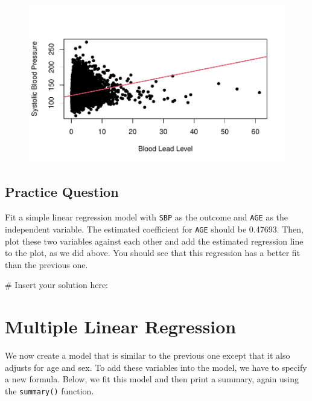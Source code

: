 \documentclass[
  letterpaper,
]{krantz}
\makeatletter
\newenvironment{Shaded}{\begin{snugshade}}{\end{snugshade}}
\newcommand{\CommentTok}[1]{\textcolor[rgb]{0.37,0.37,0.37}{#1}}
\newenvironment{kframe}{%
\medskip{}
\setlength{\fboxsep}{.8em}
 \def\at@end@of@kframe{}%
 \ifinner\ifhmode%
  \def\at@end@of@kframe{\end{minipage}}%
  \begin{minipage}{\columnwidth}%
 \fi\fi%
 \def\FrameCommand##1{\hskip\@totalleftmargin \hskip-\fboxsep
 \colorbox{shadecolor}{##1}\hskip-\fboxsep
     \hskip-\linewidth \hskip-\@totalleftmargin \hskip\columnwidth}%
 \MakeFramed {\advance\hsize-\width
   \@totalleftmargin\z@ \linewidth\hsize
   \@setminipage}}%
 {\par\unskip\endMakeFramed%
 \at@end@of@kframe}
\renewenvironment{Shaded}{\begin{kframe}}{\end{kframe}}
\makeatother
\begin{document}
\begin{figure}[H]

{\centering \includegraphics[width=1\textwidth,height=\textheight]{book/10_linear_regression_files/figure-pdf/unnamed-chunk-6-1.pdf}

}

\end{figure}

\hypertarget{practice-question-20}{%
\subsection{Practice Question}\label{practice-question-20}}

Fit a simple linear regression model with \texttt{SBP} as the outcome
and \texttt{AGE} as the independent variable. The estimated coefficient
for \texttt{AGE} should be 0.47693. Then, plot these two variables
against each other and add the estimated regression line to the plot, as
we did above. You should see that this regression has a better fit than
the previous one.

\begin{Shaded}
\begin{Highlighting}[]
\CommentTok{\# Insert your solution here:}
\end{Highlighting}
\end{Shaded}

\hypertarget{multiple-linear-regression}{%
\section{Multiple Linear Regression}\label{multiple-linear-regression}}

We now create a model that is similar to the previous one except that it
also adjusts for age and sex. To add these variables into the model, we
have to specify a new formula. Below, we fit this model and then print a
summary, again using the \texttt{summary()} function.
\end{document}
